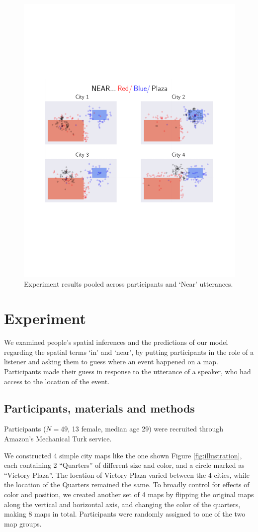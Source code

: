 \documentclass[10pt,letterpaper]{article}
\begin{document}
\begin{figure}[!]
\center
\includegraphics[width=.79\textwidth]{figures/Near.pdf}
\caption{Experiment results pooled across participants and `Near' utterances. }
\label{fig:Near}
\end{figure}

\section{Experiment}\label{sec:exps}

We examined people's spatial inferences and the predictions of our model regarding the spatial terms `in' and `near', by putting participants in the role of a listener and asking them to guess where an event happened on a map. Participants made their guess in response to the utterance of a speaker, who had access to the location of the event. 

\subsection{Participants, materials and methods}

Participants ($N=49$, 13 female, median age 29) were recruited through Amazon's Mechanical Turk service. 

We constructed 4 simple city maps like the one shown Figure \ref{fig:illustration}, each containing 2 ``Quarters'' of different size and color, and a circle marked as ``Victory Plaza''. The location of Victory Plaza varied between the 4 cities, while the location of the Quarters remained the same. To broadly control for effects of color and position, we created another set of 4 maps by flipping the original maps along the vertical and horizontal axis, and changing the color of the quarters, making 8 maps in total. Participants were randomly assigned to one of the two map groups. 
\end{document}
